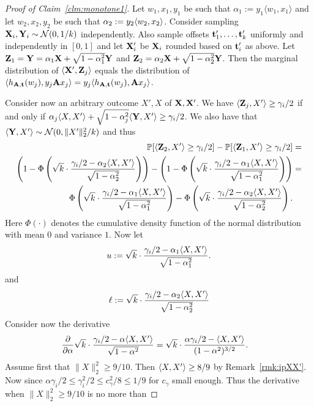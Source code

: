 \begin{proof}[Proof of Claim~\ref{clm:monotone1}]
Let $w_1,x_1,y_1$ be such that $\alpha_1 := y_1\langle w_1,x_1\rangle$ and let $w_2,x_2,y_2$ be such that $\alpha_2 := y_2 \langle w_2,x_2\rangle$. Consider sampling $\mathbf{X}_i,\mathbf{Y}_i \sim \mathcal{N}(0,1/k)$ independently. Also sample offsets $\mathbf{t}_1',\dots,\mathbf{t}_k'$ uniformly and independently in $[0,1]$ and let $\mathbf{X}'_i$ be $\mathbf{X}_i$ rounded based on $\mathbf{t}_i'$ as above. Let $\mathbf{Z}_1 = \mathbf{Y} =\alpha_1 \mathbf{X} + \sqrt{1-\alpha_1^2}\mathbf{Y}$ and $\mathbf{Z}_2 = \alpha_2 \mathbf{X} + \sqrt{1-\alpha_2^2}\mathbf{Y}$. Then the marginal distribution of $\langle \mathbf{X}', \mathbf{Z}_j\rangle$ equals the distribution of $\langle h_{\mathbf{A},\mathbf{t}}(w_j), y_j \mathbf{A} x_j\rangle = y_j\langle h_{\mathbf{A},\mathbf{t}}(w_j), \mathbf{A} x_j\rangle $. 

Consider now an arbitrary outcome $X',X$ of $\mathbf{X}, \mathbf{X}'$. We have $\langle \mathbf{Z}_j , X' \rangle \geq \gamma_i/2$ if and only if $\alpha_j \langle X, X'\rangle + \sqrt{1-\alpha_j^2} \langle \mathbf{Y}, X'\rangle \geq \gamma_i/2$. We also have that $\langle \mathbf{Y}, X'\rangle \sim \mathcal{N}(0,\|X'\|_2^2/k)$ and thus
\begin{align}
\mathbb{P}[\langle\mathbf{Z}_2,X'\rangle\geq \gamma_i/2] - \mathbb{P}[\langle\mathbf{Z}_1,X'\rangle\geq \gamma_i/2] &= \nonumber\\
\left(1-\Phi\left(\sqrt{k} \cdot \frac{\gamma_i/2-\alpha_2\langle X,X'\rangle}{\sqrt{1-\alpha_2^2}}\right)\right)-\left(1-\Phi\left(\sqrt{k} \cdot \frac{\gamma_i/2-\alpha_1\langle X,X'\rangle}{\sqrt{1-\alpha_1^2}}\right)\right)&= \nonumber\\
\Phi\left(\sqrt{k} \cdot \frac{\gamma_i/2-\alpha_1\langle X,X'\rangle}{\sqrt{1-\alpha_1^2}}\right)-\Phi\left(\sqrt{k} \cdot \frac{\gamma_i/2-\alpha_2\langle X,X'\rangle}{\sqrt{1-\alpha_2^2}}\right). \label{eq:diffcdf}
\end{align}
Here $\Phi(\cdot)$ denotes the cumulative density function of the normal distribution with mean $0$ and variance $1$. Now let
\[
u := \sqrt{k} \cdot \frac{\gamma_i/2-\alpha_1\langle X,X'\rangle}{\sqrt{1-\alpha_1^2}}.
\]
and
\[
\ell := \sqrt{k} \cdot \frac{\gamma_i/2-\alpha_2\langle X,X'\rangle}{\sqrt{1-\alpha_2^2}}
\]
Consider now the derivative
\begin{align*}
    \frac{\partial}{\partial \alpha} \sqrt{k} \cdot \frac{\gamma_i/2-\alpha\langle X,X'\rangle}{\sqrt{1-\alpha^2}} &= \sqrt{k} \cdot
    \frac{\alpha \gamma_i/2 - \langle X,X'\rangle}{(1-\alpha^2)^{3/2}}.
\end{align*}
Assume first that $\|X\|_2^2 \geq 9/10$. Then $\langle X,X'\rangle \geq 8/9$ by Remark~\ref{rmk:ipXX'}. Now since $\alpha \gamma_i/2 \leq \gamma_i^2/2 \leq c_\gamma^2/8 \leq 1/9$ for $c_\gamma$ small enough. Thus the derivative when $\|X\|_2^2 \geq 9/10$ is no more than

\end{proof}
